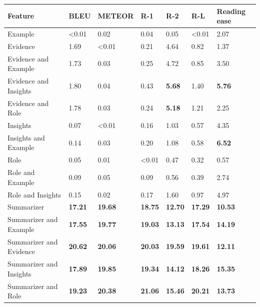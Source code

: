 \begin{tabular}{|l|l|l|l|l|l|l|}
\hline
\textbf{Feature} & BLEU & METEOR & R-1 & R-2 & R-L & Reading ease \\
 \hline
 Example & \textless{}0.01 & 0.02 & 0.04 & 0.05 & \textless{}0.01 & 2.07 \\
 \hline
 Evidence & 1.69 & \textless{}0.01 & 0.21 & 4.64 & 0.82 & 1.37 \\
 \hline
 Evidence and Example & 1.73 & 0.03 & 0.25 & 4.72 & 0.85 & 3.50 \\
 \hline
 Evidence and Insights & 1.80 & 0.04 & 0.43 & \textbf{5.68} & 1.40 & \textbf{5.76} \\
 \hline
 Evidence and Role & 1.78 & 0.03 & 0.24 & \textbf{5.18} & 1.21 & 2.25 \\
 \hline
 Insights & 0.07 & \textless{}0.01 & 0.16 & 1.03 & 0.57 & 4.35 \\
 \hline
 Insights and Example & 0.14 & 0.03 & 0.20 & 1.08 & 0.58 & \textbf{6.52} \\
 \hline
 Role & 0.05 & 0.01 & \textless{}0.01 & 0.47 & 0.32 & 0.57 \\
 \hline
 Role and Example & 0.09 & 0.05 & 0.09 & 0.56 & 0.39 & 2.74 \\
 \hline
 Role and Insights & 0.15 & 0.02 & 0.17 & 1.60 & 0.97 & 4.97 \\
 \hline
 Summarizer & \textbf{17.21} & \textbf{19.68} & \textbf{18.75} & \textbf{12.70} & \textbf{17.29} & \textbf{10.53} \\
 \hline
 Summarizer and Example & \textbf{17.55} & \textbf{19.77} & \textbf{19.03} & \textbf{13.13} & \textbf{17.54} & \textbf{14.19} \\
 \hline
 Summarizer and Evidence & \textbf{20.62} & \textbf{20.06} & \textbf{20.03} & \textbf{19.59} & \textbf{19.61} & \textbf{12.11} \\
 \hline
 Summarizer and Insights & \textbf{17.89} & \textbf{19.85} & \textbf{19.34} & \textbf{14.12} & \textbf{18.26} & \textbf{15.35} \\
 \hline
 Summarizer and Role & \textbf{19.23} & \textbf{20.38} & \textbf{21.06} & \textbf{15.46} & \textbf{20.21} & \textbf{13.73} \\
\hline
\end{tabular}
